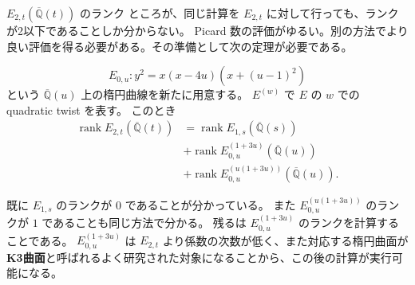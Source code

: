 \documentclass{classes/mybeamer}
\DeclareMathOperator{\rank}{rank}
\begin{document}
\begin{frame}{$E_{2,t}(\overline{\mathbb{Q}}(t))$ のランク}
    ところが、同じ計算を $E_{2,t}$ に対して行っても、ランクが2以下であることしか分からない。
    Picard 数の評価がゆるい。別の方法でより良い評価を得る必要がある。その準備として次の定理が必要である。
    \begin{thm}[Y.]
        \begin{equation*}
            E_{0,u}: y^{2} = x(x - 4u)(x + (u - 1)^{2})
        \end{equation*}
        という $\overline{\mathbb{Q}}(u)$ 上の楕円曲線を新たに用意する。
        $E^{(w)}$ で $E$ の $w$ での quadratic twist を表す。
        このとき
        \begin{equation*}
            \begin{split}
                \rank E_{2,t}(\overline{\mathbb{Q}}(t)) & = \rank E_{1,s}(\overline{\mathbb{Q}}(s))                \\
                                                        & + \rank E_{0,u}^{(1 + 3u)}(\overline{\mathbb{Q}}(u))     \\
                                                        & + \rank E_{0,u}^{(u(1 + 3u))}(\overline{\mathbb{Q}}(u)).
            \end{split}
        \end{equation*}
    \end{thm}
    既に $E_{1,s}$ のランクが $0$ であることが分かっている。
    また $E_{0,u}^{(u(1 + 3u))}$ のランクが $1$ であることも同じ方法で分かる。
    残るは $E_{0,u}^{(1 + 3u)}$ のランクを計算することである。
    $E_{0,u}^{(1 + 3u)}$ は $E_{2,t}$ より係数の次数が低く、また対応する楕円曲面が\textbf{K3曲面}と呼ばれるよく研究された対象になることから、この後の計算が実行可能になる。
\end{frame}
\end{document}
